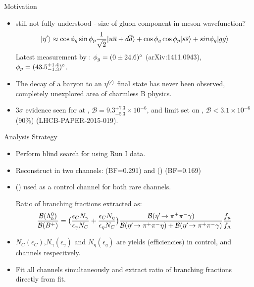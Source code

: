 \documentclass{beamer}
\def\etaorpr {\ensuremath{\Peta^{(\prime)}}\xspace}
\def\LbEtapL     {\decay{\Lb}{\Lz\etapr}\xspace}
\def\LbEtaL      {\decay{\Lb}{\Lz\Peta}\xspace}
\def\EtaGG       {\decay{\Peta}{\gamma\gamma}\xspace}
\def\EtapPiPiG   {\decay{\etapr}{\pip\pim\gamma}\xspace}
\def\EtapPiPiEta {\decay{\etapr}{\pip\pim\Peta}\xspace}
\def\LbpkEtapr {\decay{\Lb}{\proton\kaon\etapr}\xspace}
\def\BpKetapr {\decay{\Bp}{\Kp \etapr}\xspace}
\begin{document}
\begin{frame}{Motivation}
  \begin{itemize}
  \item \etapr still not fully understood - size of gluon component in meson wavefunction?
    \begin{equation}
      |\eta^{\prime}\rangle \approx \cos{\phi_{g}}\sin{\phi_{p}}\frac{1}{\sqrt{2}}|u\overline {u} + d\overline {d}\rangle + \cos{\phi_{g}}\cos{\phi_{p}}|s\overline {s}\rangle+sin{\phi_g}|gg\rangle
    \end{equation}
    Latest measurement by \lhcb:  $\phi_{g}=(0\pm 24.6)^{\circ}$ (arXiv:1411.0943),  $\phi_{p} = (43.5^{+1.4}_{-1.3}) ^{\circ}$.
  \item The decay of a \bquark baryon to an \etaorpr final state has never been observed, completely unexplored area of charmless B physics.
  \item $3\sigma$ evidence seen for \LbEtaL at \lhcb, $\mathcal{B}  = 9.3^{+7.3}_{-5.3} \times 10^{-6}$, and limit set on \LbEtapL, $\mathcal{B}<3.1 \times 10^{-6}$ (90\%) (LHCB-PAPER-2015-019).
  \end{itemize}
\end{frame}

\begin{frame}{Analysis Strategy}
  \begin{itemize}
  \item Perform blind search for \LbpkEtapr using Run I data.
  \item Reconstruct \etapr in two channels: \EtapPiPiG (BF=0.291) and \EtapPiPiEta (\EtaGG) (BF=0.169)
  \item \BpKetapr (\EtapPiPiG) used as a control channel for both rare channels.
    \begin{block}{Ratio of branching fractions extracted as:}
      \begin{equation*}
        \frac{\mathcal{B}(\Lb)}{\mathcal{B}(\Bp)} = \big(\frac{\epsilon_CN_\gamma}{\epsilon_\gamma N_C} + \frac{\epsilon_C N_\eta}{\epsilon_\eta N_C}\big)\frac{\mathcal{B}(\EtapPiPiG)}{\mathcal{B}(\EtapPiPiEta) + \mathcal{B}(\EtapPiPiG)} \frac{f_u}{f_\Lambda}
      \end{equation*}
    \end{block}
  \item $N_C (\epsilon_C)$,$N_{\gamma} (\epsilon_{\gamma})$ and $ N_{\eta} (\epsilon_{\eta})$ are yields (efficiencies) in control, \EtapPiPiG and \EtapPiPiEta channels respecitvely.
  \item Fit all channels simultaneously and extract ratio of branching fractions directly from fit.
  \end{itemize}
\end{frame}
\end{document}
